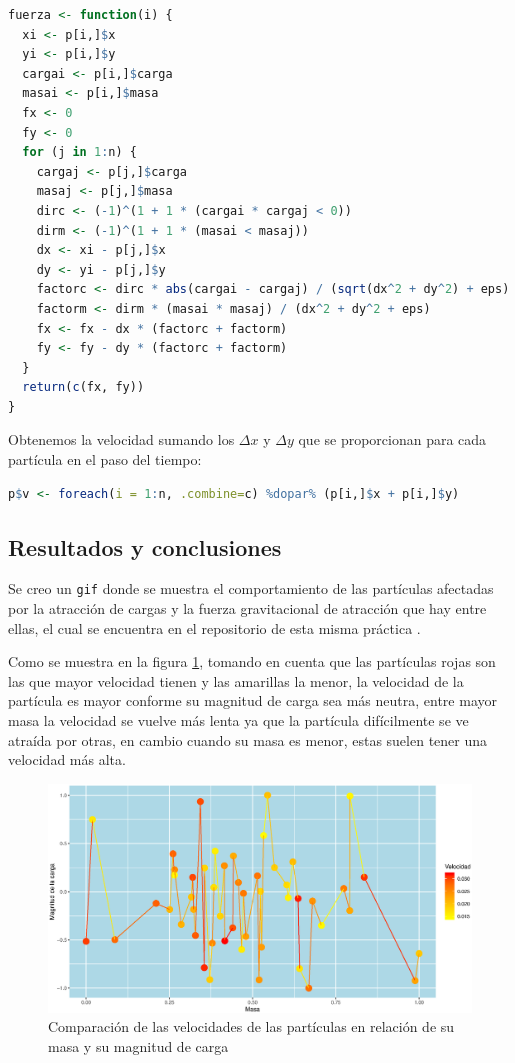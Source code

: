 \documentclass{article}
\begin{document}
\newpage

\begin{lstlisting}[language=R]
fuerza <- function(i) {
  xi <- p[i,]$x
  yi <- p[i,]$y
  cargai <- p[i,]$carga
  masai <- p[i,]$masa
  fx <- 0
  fy <- 0
  for (j in 1:n) {
    cargaj <- p[j,]$carga
    masaj <- p[j,]$masa
    dirc <- (-1)^(1 + 1 * (cargai * cargaj < 0))
    dirm <- (-1)^(1 + 1 * (masai < masaj))
    dx <- xi - p[j,]$x
    dy <- yi - p[j,]$y
    factorc <- dirc * abs(cargai - cargaj) / (sqrt(dx^2 + dy^2) + eps)
    factorm <- dirm * (masai * masaj) / (dx^2 + dy^2 + eps)
    fx <- fx - dx * (factorc + factorm)
    fy <- fy - dy * (factorc + factorm)
  }
  return(c(fx, fy))
}
\end{lstlisting}

Obtenemos la velocidad sumando los $\Delta x$ y $\Delta y$ que se proporcionan para cada part\'icula en el paso del tiempo:

\begin{lstlisting}[language=R]
p$v <- foreach(i = 1:n, .combine=c) %dopar% (p[i,]$x + p[i,]$y)
\end{lstlisting}

\subsection{Resultados y conclusiones}

Se creo un \texttt{gif} donde se muestra el comportamiento de las part\'iculas afectadas por la atracci\'on de cargas y la fuerza gravitacional de atracci\'on que hay entre ellas, el cual se encuentra en el repositorio de esta misma pr\'actica \cite{repo}.

Como se muestra en la figura \ref{fig:resultados}, tomando en cuenta que las part\'iculas rojas son las que mayor velocidad tienen y las amarillas la menor, la velocidad de la part\'icula es mayor conforme su magnitud de carga sea m\'as neutra, entre mayor masa la velocidad se vuelve m\'as lenta ya que la part\'icula dif\'icilmente se ve atra\'ida por otras, en cambio cuando su masa es menor, estas suelen tener una velocidad m\'as alta.

\newpage

\begin{figure}[h!]
\centering\includegraphics[width=120mm]{resultados.eps}
\caption{Comparaci\'on de las velocidades de las part\'iculas en relaci\'on de su masa y su magnitud de carga}
\label{fig:resultados}
\end{figure}



\end{document}
